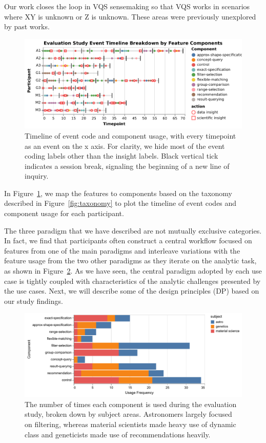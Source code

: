 Our work closes the loop in VQS sensemaking so that VQS works in scenarios  where XY is unknown or Z is unknown. These areas were previously unexplored by past works.
\begin{figure}[h!]
  \includegraphics[width=\linewidth]{figures/evalstudytimeline.pdf}
  \caption{Timeline of event code and component usage, with every timepoint as an event on the x axis. For clarity, we hide most of the event coding labels other than the insight labels. Black vertical tick indicates a session break, signaling the beginning of a new line of inquiry.}\label{fig:evalstudytimeline}
\end{figure}
In Figure~\ref{fig:evalstudytimeline}, we map the features to components based on the taxonomy described in Figure~\ref{fig:taxonomy} to plot the timeline of event codes and component usage for each participant.
\par The three paradigm that we have described are not mutually exclusive categories. In fact, we find that participants often construct a central workflow focused on features from one of the main paradigms and interleave variations with the feature usage from the two other paradigms as they iterate on the analytic task, as shown in Figure~\ref{fig:usagefreqbysubject}. As we have seen, the central paradigm adopted by each use case is tightly coupled with characteristics of the analytic challenges presented by the use cases. Next, we will describe some of the design principles (DP) based on our study findings.
\begin{figure}[h!]
  \includegraphics[width=\linewidth]{figures/usagefreqbysubject.pdf}
  \caption{The number of times each component is used during the evaluation study, broken down by subject areas. Astronomers largely focused on filtering, whereas material scientists made heavy use of dynamic class and geneticists made use of recommendations heavily.}\label{fig:usagefreqbysubject}
\end{figure}
